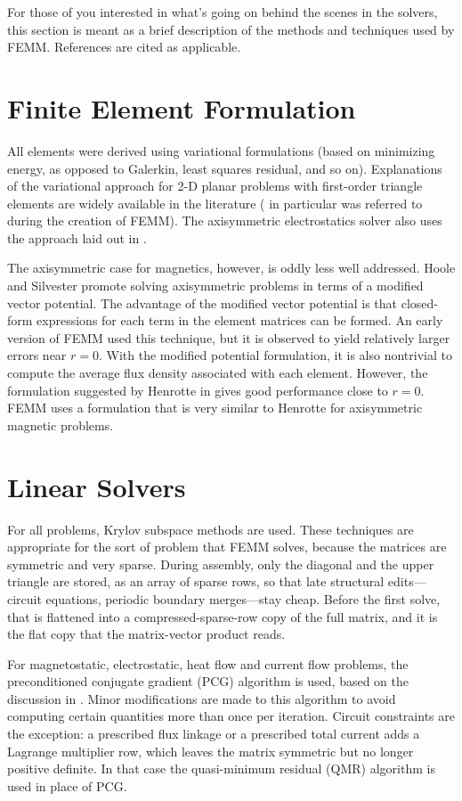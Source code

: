 \documentclass[12pt]{report}
\begin{document}
For those of you interested in what's going on behind the scenes in
the solvers, this section is meant as a brief description of the
methods and techniques used by FEMM. References are cited as
applicable.

\section{Finite Element Formulation}

All elements were derived using variational formulations (based on
minimizing energy, as opposed to Galerkin, least squares residual,
and so on).  Explanations of the variational approach for 2-D
planar problems with first-order triangle elements are widely
available in the literature (\cite{allaire} in particular was
referred to during the creation of FEMM).  The axisymmetric
electrostatics solver also uses the approach laid out in
\cite{allaire}.

The axisymmetric case for magnetics, however, is oddly less well
addressed. Hoole \cite{Hoole} and Silvester \cite{silv} promote
solving axisymmetric problems in terms of a modified vector
potential. The advantage of the modified vector potential is that
closed-form expressions for each term in the element matrices can
be formed. An early version of FEMM used this technique, but it is
observed to yield relatively larger errors near $r=0$. With the
modified potential formulation, it is also nontrivial to compute
the average flux density associated with each element. However, the
formulation suggested by Henrotte in \cite{Henrotte} gives good
performance close to $r=0$. FEMM uses a formulation that is very
similar to Henrotte for axisymmetric magnetic problems.

\section{Linear Solvers}

For all problems, Krylov subspace methods are used.  These techniques
are appropriate for the sort of problem that FEMM solves, because the
matrices are symmetric and very sparse.  During assembly, only the
diagonal and the upper triangle are stored, as an array of sparse rows,
so that late structural edits---circuit equations, periodic boundary
merges---stay cheap.  Before the first solve, that is flattened into a
compressed-sparse-row copy of the full matrix, and it is the flat copy
that the matrix-vector product reads.

For magnetostatic, electrostatic, heat flow and current flow problems,
the preconditioned conjugate gradient (PCG) algorithm is used, based on
the discussion in \cite{silv}.  Minor modifications are made to this
algorithm to avoid computing certain quantities more than once per
iteration.  Circuit constraints are the exception: a prescribed flux
linkage or a prescribed total current adds a Lagrange multiplier row,
which leaves the matrix symmetric but no longer positive definite.  In
that case the quasi-minimum residual (QMR) algorithm is used in place of
PCG.
\end{document}
